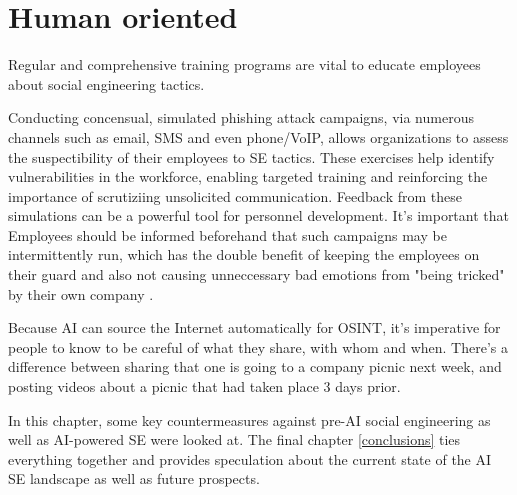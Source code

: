 \section{Human oriented}
\begin{comment}
    
    - The best defense against SE attacks is an educated, conscious user
    - User education should be continuous and not a one-off event

\end{comment}

Regular and comprehensive training programs are vital to educate employees about social engineering tactics.

Conducting concensual, simulated phishing attack campaigns, via numerous channels such as email, SMS and even phone/VoIP, allows organizations to assess the suspectibility of their employees to SE tactics. These exercises help identify vulnerabilities in the workforce, enabling targeted training and reinforcing the importance of scrutiziing unsolicited communication. Feedback from these simulations can be a powerful tool for personnel development. It's important that Employees should be informed beforehand that such campaigns may be intermittently run, which has the double benefit of keeping the employees on their guard and also not causing unneccessary bad emotions from "being tricked" by their own company \citep{hadnagySocialEngineering2018, mitnickArtDeceptionControlling2003}.


Because AI can source the Internet automatically for OSINT, it's imperative for people to know to be careful of what they share, with whom and when. There's a difference between sharing that one is going to a company picnic next week, and posting videos about a picnic that had taken place 3 days prior.



In this chapter, some key countermeasures against pre-AI social engineering as well as AI-powered SE were looked at. The final chapter \ref{conclusions} ties everything together and provides speculation about the current state of the AI SE landscape as well as future prospects.

